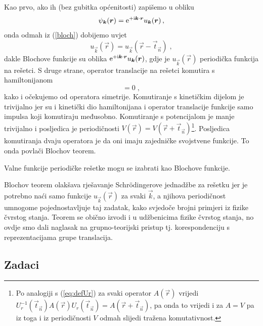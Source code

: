 Kao prvo, ako ih (bez gubitka općenitosti) zapišemo u obliku
\begin{equation}
 \psi_{\vec{k}}(\vec{r}) = \rme^{+\rmi \vec{k}\cdot \vec{r}} u_{\vec{k}}(\vec{r}) \,,
\end{equation}
onda odmah iz (\ref{bloch}) dobijemo uvjet 
\begin{equation}
  u_{\vec{k}}(\vec{r}) = u_{\vec{k}}(\vec{r} - \vec{t}_{\vec{n}})  \;,
\end{equation}
dakle Blochove funkcije su oblika 
$\rme^{+\rmi \vec{k}\cdot \vec{r}} u_{\vec{k}}(\vec{r})$,
gdje je $u_{\vec{k}}(\vec{r})$ periodička funkcija na rešetci.
S druge strane, operator translacije na rešetci komutira s hamiltonijanom
\begin{equation}
    [H, U_{r}^{(\vec{k})} (\vec{t}_{\vec{n}}) ] = 0 \;,
\end{equation}
kako i očekujemo od operatora simetrije.
Komutiranje s kinetičkim dijelom je trivijalno jer su i kinetički dio
hamiltonijana i operator translacije funkcije samo impulsa koji
komutiraju međusobno.  Komutiranje s potencijalom je manje trivijalno
i posljedica je periodičnosti $V(\vec{r}) = 
V(\vec{r}+\vec{t}_{\vec{n}})$\footnote{Po analogiji s
    (\ref{eq:defUr}) za svaki operator $A(\vec{r})$ vrijedi
    $U_{r}^{-1}(\vec{t}_{\vec{n}})
A(\vec{r}) U_{r}(\vec{t}_{\vec{n}}) = A(\vec{r}+\vec{t}_{\vec{n}})$,
pa onda to vrijedi i za $A=V$ pa iz toga i iz periodičnosti $V$ odmah slijedi tražena
komutativnost.}.
Posljedica komutiranja dvaju operatora je da oni imaju zajedničke
svojstvene funkcije. To onda povlači Blochov teorem.
\begin{teorem}[Bloch]
Valne funkcije periodičke rešetke mogu se izabrati kao Blochove funkcije.
\end{teorem}

Blochov teorem olakšava rješavanje Schr\"{o}dingerove jednadžbe
za rešetku jer je potrebno naći samo funkcije $u_{\vec{k}}(\vec{r})$ za
svaki $\vec{k}$,
a njihova periodičnost umnogome pojednostavljuje taj zadatak,
kako svjedoče brojni primjeri iz fizike čvrstog stanja.
Teorem se obično izvodi i u udžbenicima fizike čvrstog
stanja, no ovdje smo dali naglasak
na grupno-teorijski pristup tj. korespondenciju s reprezentacijama
grupe translacija.

\subsection*{Zadaci}

